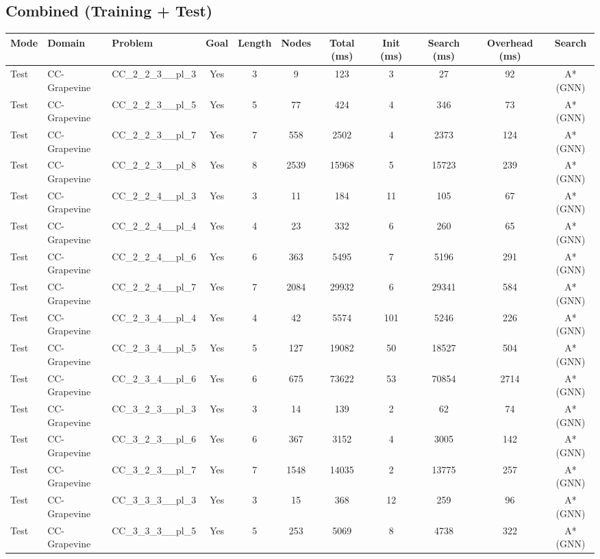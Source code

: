 \documentclass{article}
\begin{document}
\subsection*{Combined (Training + Test)}
\begin{tabular}{lllcccccccc}
\toprule
Mode & Domain & Problem & Goal & Length & Nodes & Total (ms) & Init (ms) & Search (ms) & Overhead (ms) & Search \\
\midrule
Test & CC-Grapevine & CC\_2\_2\_3\_\_pl\_3 & Yes & 3 & 9 & 123 & 3 & 27 & 92 & A*(GNN) \\
Test & CC-Grapevine & CC\_2\_2\_3\_\_pl\_5 & Yes & 5 & 77 & 424 & 4 & 346 & 73 & A*(GNN) \\
Test & CC-Grapevine & CC\_2\_2\_3\_\_pl\_7 & Yes & 7 & 558 & 2502 & 4 & 2373 & 124 & A*(GNN) \\
Test & CC-Grapevine & CC\_2\_2\_3\_\_pl\_8 & Yes & 8 & 2539 & 15968 & 5 & 15723 & 239 & A*(GNN) \\
Test & CC-Grapevine & CC\_2\_2\_4\_\_pl\_3 & Yes & 3 & 11 & 184 & 11 & 105 & 67 & A*(GNN) \\
Test & CC-Grapevine & CC\_2\_2\_4\_\_pl\_4 & Yes & 4 & 23 & 332 & 6 & 260 & 65 & A*(GNN) \\
Test & CC-Grapevine & CC\_2\_2\_4\_\_pl\_6 & Yes & 6 & 363 & 5495 & 7 & 5196 & 291 & A*(GNN) \\
Test & CC-Grapevine & CC\_2\_2\_4\_\_pl\_7 & Yes & 7 & 2084 & 29932 & 6 & 29341 & 584 & A*(GNN) \\
Test & CC-Grapevine & CC\_2\_3\_4\_\_pl\_4 & Yes & 4 & 42 & 5574 & 101 & 5246 & 226 & A*(GNN) \\
Test & CC-Grapevine & CC\_2\_3\_4\_\_pl\_5 & Yes & 5 & 127 & 19082 & 50 & 18527 & 504 & A*(GNN) \\
Test & CC-Grapevine & CC\_2\_3\_4\_\_pl\_6 & Yes & 6 & 675 & 73622 & 53 & 70854 & 2714 & A*(GNN) \\
Test & CC-Grapevine & CC\_3\_2\_3\_\_pl\_3 & Yes & 3 & 14 & 139 & 2 & 62 & 74 & A*(GNN) \\
Test & CC-Grapevine & CC\_3\_2\_3\_\_pl\_6 & Yes & 6 & 367 & 3152 & 4 & 3005 & 142 & A*(GNN) \\
Test & CC-Grapevine & CC\_3\_2\_3\_\_pl\_7 & Yes & 7 & 1548 & 14035 & 2 & 13775 & 257 & A*(GNN) \\
Test & CC-Grapevine & CC\_3\_3\_3\_\_pl\_3 & Yes & 3 & 15 & 368 & 12 & 259 & 96 & A*(GNN) \\
Test & CC-Grapevine & CC\_3\_3\_3\_\_pl\_5 & Yes & 5 & 253 & 5069 & 8 & 4738 & 322 & A*(GNN) \\

\end{tabular}
\end{document}
